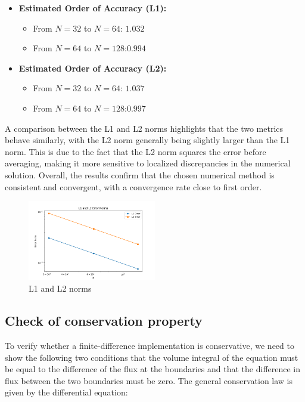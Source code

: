 \documentclass{article}
\begin{document}
\begin{itemize}
    \item \textbf{Estimated Order of Accuracy (L1):}
    \begin{itemize}
        \item From $N = 32$ to $N = 64$: \quad $1.032$
        \item From $N = 64$ to $N = 128$:\quad $0.994$
    \end{itemize}
    
    \item \textbf{Estimated Order of Accuracy (L2):}
    \begin{itemize}
        \item From $N = 32$ to $N = 64$: \quad $1.037$
        \item From $N = 64$ to $N = 128$:\quad $0.997$
    \end{itemize}
\end{itemize}
A comparison between the L1 and L2 norms highlights that the two metrics behave similarly, with the L2 norm generally being 
slightly larger than the L1 norm. This is due to the fact that the L2 norm squares the error before averaging, making it more 
sensitive to localized discrepancies in the numerical solution. Overall, the results confirm that the chosen numerical method 
is consistent and convergent, with a convergence rate close to first order. 

\begin{figure}[h!]
  \centering
  \includegraphics[width=0.5\textwidth]{FDM_Error.png}
  \caption{L1 and L2 norms}
\end{figure}

\subsection{Check of conservation property}

To verify whether a finite-difference implementation is conservative, we need to show the following two conditions that the volume integral 
of the equation must be equal to the difference of the flux at the boundaries and that the difference in flux between the two boundaries must 
be zero. The general conservation law is given by the differential equation:
\end{document}
